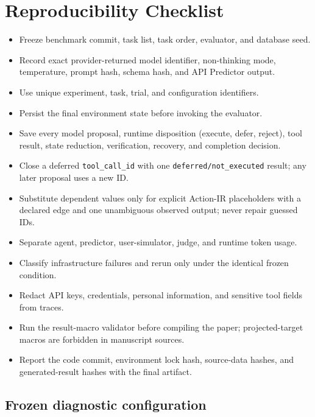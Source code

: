 \section{Reproducibility Checklist}
\label{app:reproducibility}

\begin{itemize}[leftmargin=*,itemsep=2pt]
  \item Freeze benchmark commit, task list, task order, evaluator, and database seed.
  \item Record exact provider-returned model identifier, non-thinking mode,
        temperature, prompt hash, schema hash, and API Predictor output.
  \item Use unique experiment, task, trial, and configuration identifiers.
  \item Persist the final environment state before invoking the evaluator.
  \item Save every model proposal, runtime disposition (execute, defer, reject),
        tool result, state reduction, verification, recovery, and completion decision.
  \item Close a deferred \texttt{tool\_call\_id} with one
        \texttt{deferred/not\_executed} result; any later proposal uses a new ID.
  \item Substitute dependent values only for explicit Action-IR placeholders with
        a declared edge and one unambiguous observed output; never repair guessed IDs.
  \item Separate agent, predictor, user-simulator, judge, and runtime token usage.
  \item Classify infrastructure failures and rerun only under the identical frozen condition.
  \item Redact API keys, credentials, personal information, and sensitive tool fields from traces.
  \item Run the result-macro validator before compiling the paper; projected-target
        macros are forbidden in manuscript sources.
  \item Report the code commit, environment lock hash, source-data hashes, and
        generated-result hashes with the final artifact.
\end{itemize}

\subsection{Frozen diagnostic configuration}

